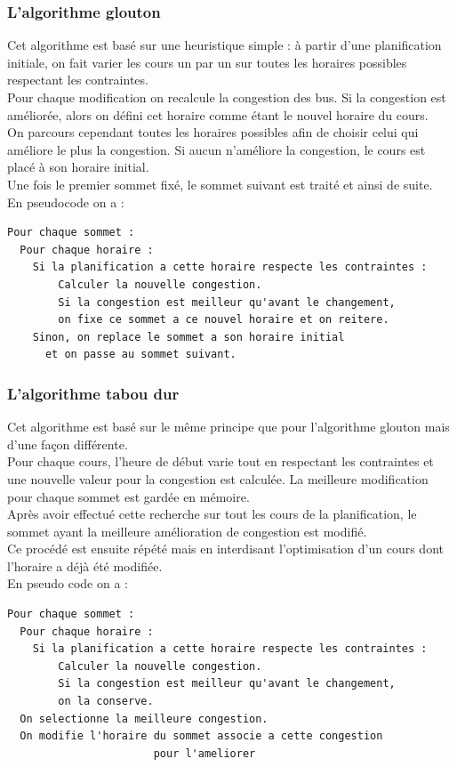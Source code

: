 \documentclass[a4paper,11pt]{article}
\begin{document}
		\subsubsection{L'algorithme glouton}
			Cet algorithme est basé sur une heuristique simple : à partir d'une planification initiale, on fait varier les cours un par un sur toutes les horaires possibles respectant les contraintes.\\
			Pour chaque modification on recalcule la congestion des bus. Si la congestion est améliorée, alors on défini cet horaire comme étant le nouvel horaire du cours.\\
			On parcours cependant toutes les horaires possibles afin de choisir celui qui améliore le plus la congestion. Si aucun n'améliore la congestion, le cours est placé à son horaire initial.\\
			Une fois le premier sommet fixé, le sommet suivant est traité et ainsi de suite.\\
			En pseudocode on a :\\
\begin{lstlisting}
Pour chaque sommet :
  Pour chaque horaire :
  	Si la planification a cette horaire respecte les contraintes :
    	Calculer la nouvelle congestion.
    	Si la congestion est meilleur qu'avant le changement,
      	on fixe ce sommet a ce nouvel horaire et on reitere. 
    Sinon, on replace le sommet a son horaire initial 
      et on passe au sommet suivant.
		\end{lstlisting}

		\subsubsection{L'algorithme tabou dur}
			Cet algorithme est basé sur le même principe que pour l'algorithme glouton mais d'une façon différente.\\
			Pour chaque cours, l'heure de début varie tout en respectant les contraintes et une nouvelle valeur pour la congestion est calculée. La meilleure modification pour chaque sommet est gardée en mémoire.\\
			Après avoir effectué cette recherche sur tout les cours de la planification, le sommet ayant la meilleure amélioration de congestion est modifié.\\
			Ce procédé est ensuite répété mais en interdisant l'optimisation d'un cours dont l'horaire a déjà été modifiée.\\
			En pseudo code on a :\\
\begin{lstlisting}
Pour chaque sommet :
  Pour chaque horaire :
  	Si la planification a cette horaire respecte les contraintes :
    	Calculer la nouvelle congestion.
    	Si la congestion est meilleur qu'avant le changement,
      	on la conserve.
  On selectionne la meilleure congestion. 
  On modifie l'horaire du sommet associe a cette congestion 
  					   pour l'ameliorer
		\end{lstlisting}
\end{document}
